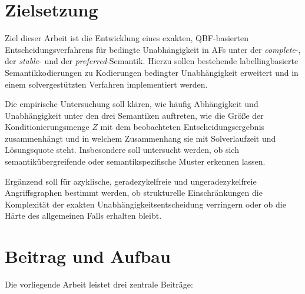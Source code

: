 \section{Zielsetzung}
\label{sec:einleitung-zielsetzung}

Ziel dieser Arbeit ist die Entwicklung eines exakten,
QBF-basierten Entscheidungsverfahrens für bedingte Unabhängigkeit
in AFs unter der \emph{complete}-, der \emph{stable}- und der 
\emph{preferred}-Semantik. Hierzu sollen bestehende labellingbasierte
Semantikkodierungen zu Kodierungen bedingter Unabhängigkeit erweitert
und in einem solvergestützten Verfahren implementiert werden.

Die empirische Untersuchung soll klären, wie häufig Abhängigkeit und
Unabhängigkeit unter den drei Semantiken auftreten, wie die Größe der
Konditionierungsmenge \(Z\) mit dem beobachteten Entscheidungsergebnis
zusammenhängt und in welchem Zusammenhang sie mit Solverlaufzeit und
Lösungsquote steht. Insbesondere soll untersucht werden, ob sich
semantikübergreifende oder semantikspezifische Muster erkennen lassen.

Ergänzend soll für azyklische, geradezykelfreie und
ungeradezykelfreie Angriffsgraphen bestimmt werden, ob strukturelle
Einschränkungen die Komplexität der exakten
Unabhängigkeitsentscheidung verringern oder ob die Härte des
allgemeinen Falls erhalten bleibt.


\section{Beitrag und Aufbau}
\label{sec:einleitung-beitrag-aufbau}

Die vorliegende Arbeit leistet drei zentrale Beiträge:

